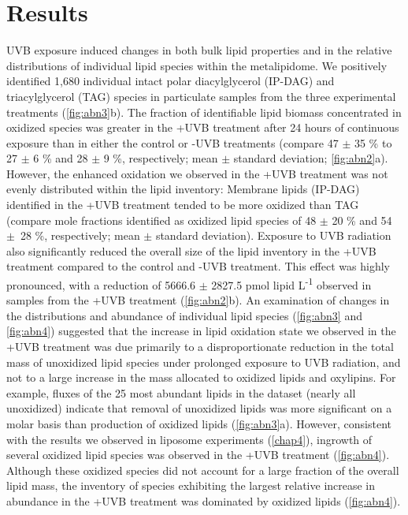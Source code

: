 \section{Results}

UVB exposure induced changes in both bulk lipid properties and in the relative distributions of individual lipid species within the metalipidome. We positively identified 1,680 individual intact polar diacylglycerol (IP-DAG) and triacylglycerol (TAG) species in particulate samples from the three experimental treatments (\autoref{fig:abn3}b). The fraction of identifiable lipid biomass concentrated in oxidized species was greater in the +UVB treatment after 24 hours of continuous exposure than in either the control or -UVB treatments (compare 47 $\pm$ 35 \% to 27 $\pm$ 6 \% and 28 $\pm$ 9 \%, respectively; mean $\pm$ standard deviation; \autoref{fig:abn2}a). However, the enhanced oxidation we observed in the +UVB treatment was not evenly distributed within the lipid inventory: Membrane lipids (IP-DAG) identified in the +UVB treatment tended to be more oxidized than TAG (compare mole fractions identified as oxidized lipid species of 48 $\pm$ 20 \% and 54 $\pm$~28 \%, respectively; mean $\pm$ standard deviation). Exposure to UVB radiation also significantly reduced the overall size of the lipid inventory in the +UVB treatment compared to the control and -UVB treatment. This effect was highly pronounced, with a reduction of 5666.6 $\pm$ 2827.5 pmol lipid L\textsuperscript{-1} observed in samples from the +UVB treatment (\autoref{fig:abn2}b). An examination of changes in the distributions and abundance of individual lipid species (\autoref{fig:abn3} and \autoref{fig:abn4}) suggested that the increase in lipid oxidation state we observed in the +UVB treatment was due primarily to a disproportionate reduction in the total mass of unoxidized lipid species under prolonged exposure to UVB radiation, and not to a large increase in the mass allocated to oxidized lipids and oxylipins. For example, fluxes of the 25 most abundant lipids in the dataset (nearly all unoxidized) indicate that removal of unoxidized lipids was more significant on a molar basis than production of oxidized lipids (\autoref{fig:abn3}a). However, consistent with the results we observed in liposome experiments (\autoref{chap4}), ingrowth of several oxidized lipid species was observed in the +UVB treatment (\autoref{fig:abn4}). Although these oxidized species did not account for a large fraction of the overall lipid mass, the inventory of species exhibiting the largest relative increase in abundance in the +UVB treatment was dominated by oxidized lipids (\autoref{fig:abn4}).

